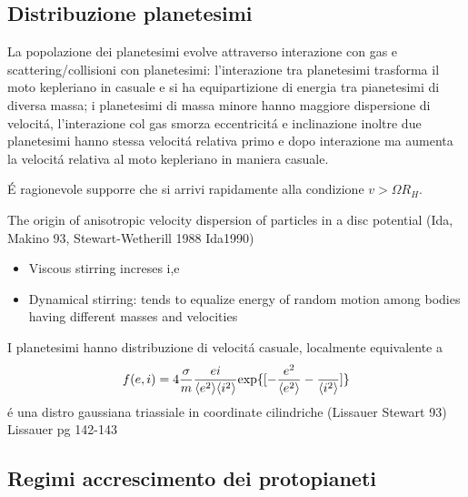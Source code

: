 \subsection{Distribuzione planetesimi}

La popolazione dei planetesimi evolve attraverso interazione con gas e scattering/collisioni con planetesimi: l'interazione tra planetesimi trasforma il moto kepleriano in casuale e si ha equipartizione di energia tra pianetesimi di diversa massa; i planetesimi di massa minore hanno maggiore dispersione di velocit\'a, l'interazione col gas smorza eccentricit\'a e inclinazione inoltre due planetesimi hanno stessa velocit\'a relativa primo e dopo interazione ma aumenta la velocit\'a relativa al moto kepleriano in maniera casuale.

\'E ragionevole supporre che si arrivi rapidamente alla condizione $v>\Omega R_H$.

\begin{workout}
The origin of anisotropic velocity dispersion of particles in a disc potential (Ida, Makino 93, Stewart-Wetherill 1988 Ida1990)
\end{workout}

\begin{workout}
\begin{itemize}
\item Viscous stirring increses i,e
\item Dynamical stirring: tends to equalize energy of random motion among bodies having different masses and velocities
\end{itemize}
\end{workout}

\begin{workout}
I planetesimi hanno distribuzione di velocit\'a casuale, localmente equivalente a
\begin{equation}
f(e,i)=4\frac{\sigma}{m}\frac{ei}{\langle e^2 \rangle\langle i^2 \rangle}\text{exp}\{[-\frac{e^2}{\langle e^2 \rangle}-\frac{}{\langle i^2 \rangle}]\}
\end{equation}
\'e una distro gaussiana triassiale in coordinate cilindriche (Lissauer Stewart 93)
Lissauer pg 142-143
\end{workout}

\subsection{Regimi accrescimento dei protopianeti}

